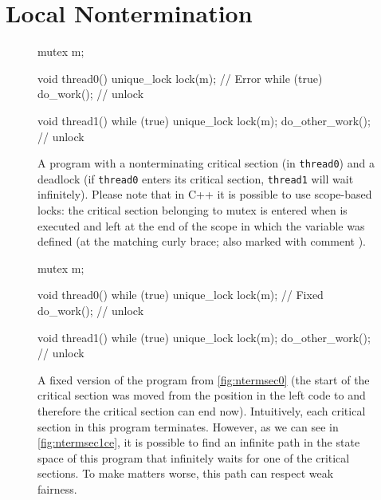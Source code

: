 \section{Local Nontermination} \label{sec:local-nontermination}

\begin{figure}[tp]
\begin{minipage}[t]{0.49\textwidth}
\begin{cppcode}
    mutex m;

    void thread0() {
      unique_lock lock(m); // Error
      while (true) {
        do_work();
      }
    } // unlock

    void thread1() {
      while (true) {
        unique_lock lock(m);
        do_other_work();
      } // unlock
    }
\end{cppcode}
\caption{
    A program with a nonterminating critical section (in \texttt{thread0}) and a deadlock (if \texttt{thread0} enters its critical section, \texttt{thread1} will wait infinitely).
    Please note that in C++ it is possible to use scope-based locks: the critical section belonging to mutex  is entered when  is executed and left at the end of the scope in which the  variable was defined (at the matching curly brace; also marked with comment ).
}\label{fig:ntermsec0}
\end{minipage}
%
\hfill
%
\begin{minipage}[t]{0.49\textwidth}
\begin{cppcode}
    mutex m;

    void thread0() {
      while (true) {
        unique_lock lock(m); // Fixed
        do_work();
      } // unlock
    }

    void thread1() {
      while (true) {
        unique_lock lock(m);
        do_other_work();
      } // unlock
    }
\end{cppcode}
\caption{
    A fixed version of the program from \autoref{fig:ntermsec0} (the start of the critical section was moved from the position  in the left code to  and therefore the critical section can end now).
    Intuitively, each critical section in this program terminates.
    However, as we can see in \autoref{fig:ntermsec1ce}, it is possible to find an infinite path in the state space of this program that infinitely waits for one of the critical sections.
    To make matters worse, this path can respect weak fairness.
} \label{fig:ntermsec1}
\end{minipage}
\end{figure}
